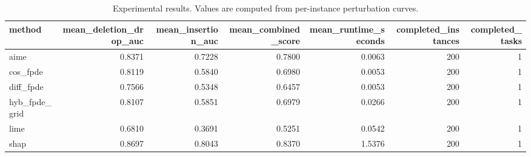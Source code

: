 \begin{table}[t]
\caption{Experimental results. Values are computed from per-instance perturbation curves.}
\label{tab:main_results_computed}
\centering
\begin{tabular}{lrrrrrr}
\toprule
method & mean\_deletion\_drop\_auc & mean\_insertion\_auc & mean\_combined\_score & mean\_runtime\_seconds & completed\_instances & completed\_tasks \\
\midrule
aime & 0.8371 & 0.7228 & 0.7800 & 0.0063 & 200 & 1 \\
cos\_fpde & 0.8119 & 0.5840 & 0.6980 & 0.0053 & 200 & 1 \\
diff\_fpde & 0.7566 & 0.5348 & 0.6457 & 0.0053 & 200 & 1 \\
hyb\_fpde\_grid & 0.8107 & 0.5851 & 0.6979 & 0.0266 & 200 & 1 \\
lime & 0.6810 & 0.3691 & 0.5251 & 0.0542 & 200 & 1 \\
shap & 0.8697 & 0.8043 & 0.8370 & 1.5376 & 200 & 1 \\
\bottomrule
\end{tabular}

\end{table}
